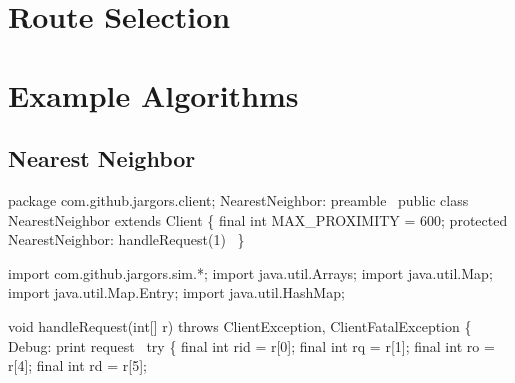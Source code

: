 
\nwenddocs{}\chapter{Route Selection}
\label{search-routes}

\nwenddocs{}\chapter{Example Algorithms}
\label{search-algorithms}

\section{Nearest Neighbor}

\nwenddocs{}\endmoddef\nwstartdeflinemarkup\nwenddeflinemarkup
package com.github.jargors.client;
\LA{}NearestNeighbor: preamble~{\nwtagstyle{}}\RA{}
public class NearestNeighbor extends Client \{
  final int MAX_PROXIMITY = 600;
  protected \LA{}NearestNeighbor: handleRequest(1)~{\nwtagstyle{}}\RA{}
\}
\nwendcode{}\nwdocspar

\nwenddocs{}\endmoddef\nwstartdeflinemarkup{}\nwenddeflinemarkup
import com.github.jargors.sim.*;
import java.util.Arrays;
import java.util.Map;
import java.util.Map.Entry;
import java.util.HashMap;
\nwendcode{}\nwdocspar

\nwenddocs{}\endmoddef\nwstartdeflinemarkup{}\nwenddeflinemarkup
void handleRequest(int[] r) throws ClientException, ClientFatalException \{
  \LA{}Debug: print request~{\nwtagstyle{}}\RA{}
  try \{
    final int rid = r[0];
    final int rq  = r[1];
    final int ro  = r[4];
    final int rd  = r[5];

